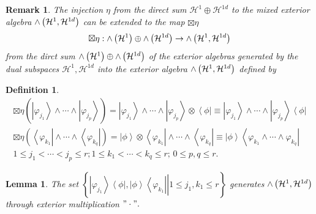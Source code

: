 \documentclass[aps,preprint]{revtex4}%
\newtheorem{definition}[theorem]{Definition}
\newtheorem{lemma}[theorem]{Lemma}
\newtheorem{remark}[theorem]{Remark}
\begin{document}
\begin{remark}
The injection $\eta$ from the direct sum $\mathcal{H}^{1}\oplus\mathcal{H}%
^{1d}$ to the mixed exterior algebra ${\huge \wedge}\left(  \mathcal{H}%
^{1},\mathcal{H}^{1d}\right)  $ can be extended to the map $\boxtimes\eta$
\begin{equation}
\boxtimes\eta:{\huge \wedge}\left(  \mathcal{H}^{1}\right)  \oplus
{\huge \wedge}\left(  \mathcal{H}^{1d}\right)  \rightarrow{\huge \wedge
}\left(  \mathcal{H}^{1},\mathcal{H}^{1d}\right)
\end{equation}
from the dirct sum ${\huge \wedge}\left(  \mathcal{H}^{1}\right)
\oplus{\huge \wedge}\left(  \mathcal{H}^{1d}\right)  $ of the exterior
algebras generated by the dual subspaces $\mathcal{H}^{1},\mathcal{H}^{1d}$
into the exterior algebra ${\huge \wedge}\left(  \mathcal{H}^{1}%
,\mathcal{H}^{1d}\right)  $ defined by
\end{remark}

\begin{definition}%
\begin{gather}
\boxtimes\eta\left(  \left\vert \varphi_{j_{1}}\right\rangle \wedge
\cdots\wedge\left\vert \varphi_{j_{p}}\right\rangle \right)  =\left\vert
\varphi_{j_{1}}\right\rangle \wedge\cdots\wedge\left\vert \varphi_{j_{p}%
}\right\rangle \otimes\left\langle \phi\right\vert \equiv\left\vert
\varphi_{j_{1}}\right\rangle \wedge\cdots\wedge\left\vert \varphi_{j_{p}%
}\right\rangle \left\langle \phi\right\vert \\
\boxtimes\eta\left(  \left\langle \varphi_{k_{1}}\right\vert \wedge
\cdots\wedge\left\langle \varphi_{k_{q}}\right\vert \right)  =\left\vert
\phi\right\rangle \otimes\left\langle \varphi_{k_{1}}\right\vert \wedge
\cdots\wedge\left\langle \varphi_{k_{q}}\right\vert \equiv\left\vert
\phi\right\rangle \left\langle \varphi_{k_{1}}\wedge\cdots\wedge\varphi
_{k_{q}}\right\vert \\
1\leq j_{1}<\cdots<j_{p}\leq r;1\leq k_{1}<\cdots<k_{q}\leq r;\,0\leq p,q\leq
r.
\end{gather}

\end{definition}

\begin{lemma}
The set $\left\{  \left.  \overset{}{\left\vert \varphi_{j_{1}}\right\rangle
\left\langle \phi\right\vert ,\left\vert \phi\right\rangle \left\langle
\varphi_{k_{1}}\right\vert }\right\vert 1\leq j_{1},k_{1}\leq r\right\}  $
generates ${\huge \wedge}\left(  \mathcal{H}^{1},\mathcal{H}^{1d}\right)  $
through exterior multiplication $"\cdot".$
\end{lemma}
\end{document}
